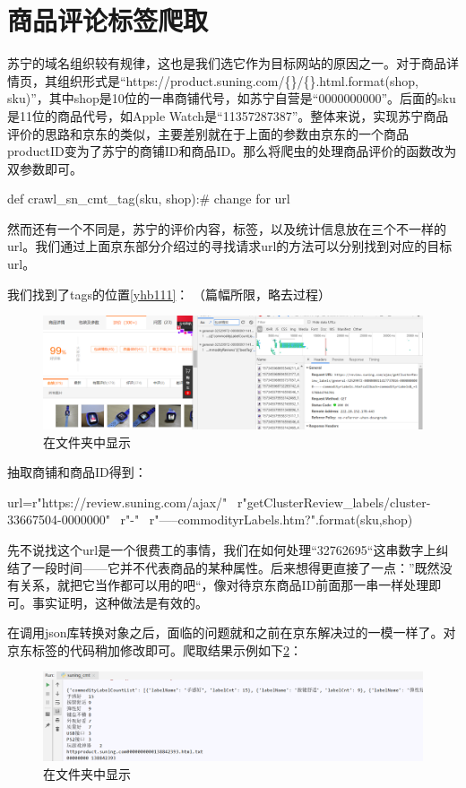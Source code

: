 \section{商品评论标签爬取}

苏宁的域名组织较有规律，这也是我们选它作为目标网站的原因之一。对于商品详情页，其组织形式是“https://product.suning.com/\{\}/\{\}.html.format(shop, sku)”，其中shop是10位的一串商铺代号，如苏宁自营是“0000000000”。后面的sku是11位的商品代号，如Apple Watch是“11357287387”。整体来说，实现苏宁商品评价的思路和京东的类似，主要差别就在于上面的参数由京东的一个商品productID变为了苏宁的商铺ID和商品ID。那么将爬虫的处理商品评价的函数改为双参数即可。
\begin{python}
def crawl_sn_cmt_tag(sku, shop):# change for url
\end{python}

然而还有一个不同是，苏宁的评价内容，标签，以及统计信息放在三个不一样的url。我们通过上面京东部分介绍过的寻找请求url的方法可以分别找到对应的目标url。

我们找到了tags的位置\ref{yhb111}：
（篇幅所限，略去过程）
\begin{figure}[htbp]
\centering
\includegraphics[width=13.5cm]{img/yhb/sn_eg2.png}
\caption{在文件夹中显示}
\label{img:yhb111}   %
\end{figure}

抽取商铺和商品ID得到：
\begin{python}
url=r"https://review.suning.com/ajax/" \
        r"getClusterReview_labels/cluster-33667504-0000000" \
        r"{}-{}" \
        r"-----commodityrLabels.htm?".format(sku,shop)
\end{python}


先不说找这个url是一个很费工的事情，我们在如何处理“32762695“这串数字上纠结了一段时间——它并不代表商品的某种属性。后来想得更直接了一点：”既然没有关系，就把它当作都可以用的吧“，像对待京东商品ID前面那一串一样处理即可。事实证明，这种做法是有效的。

在调用json库转换对象之后，面临的问题就和之前在京东解决过的一模一样了。对京东标签的代码稍加修改即可。爬取结果示例如下\ref{img:yhb100}：
\begin{figure}[htbp]
\centering
\includegraphics[width=13.5cm]{img/yhb/sn_res1.png}
\caption{在文件夹中显示}
\label{img:yhb100}   %
\end{figure}

